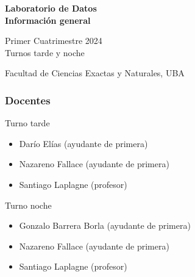 \documentclass[aspectratio=169,12pt]{beamer}
\begin{document}

\begin{frame}

 \begin{center}

\Large\textbf{Laboratorio de Datos} \\
\large\textbf{Información general}




\vspace{1cm}
Primer Cuatrimestre 2024 \\ Turnos tarde y noche

\vspace{1cm}
 
 
 {\small Facultad de Ciencias Exactas y Naturales, UBA}
 \end{center}


\end{frame}


\begin{frame}
\frametitle{Docentes}

{\large Turno tarde}

\begin{itemize}
\item Darío Elías (ayudante de primera)
\item Nazareno Fallace (ayudante de primera)
\item Santiago Laplagne (profesor)
\end{itemize}

{\large Turno noche}

\begin{itemize}
\item Gonzalo Barrera Borla (ayudante de primera)
\item Nazareno Fallace (ayudante de primera)
\item Santiago Laplagne (profesor)
\end{itemize}

\end{frame}
\end{document}
